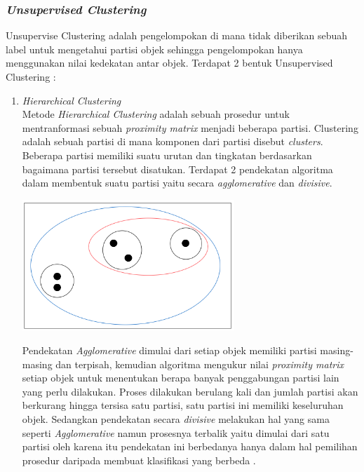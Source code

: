 \subsubsection{\textit{Unsupervised Clustering}}
Unsupervise Clustering adalah pengelompokan di mana tidak diberikan sebuah label untuk mengetahui partisi objek sehingga pengelompokan hanya menggunakan nilai kedekatan antar objek. Terdapat 2 bentuk Unsupervised Clustering \cite{2C9}:
\begin{enumerate}[leftmargin=1.3cm]
	\item \textit{Hierarchical Clustering} \\
	Metode \textit{Hierarchical Clustering} adalah sebuah prosedur untuk mentranformasi sebuah \textit{proximity matrix} menjadi beberapa partisi. Clustering adalah sebuah partisi di mana komponen dari partisi disebut \textit{clusters}. Beberapa partisi memiliki suatu urutan dan tingkatan berdasarkan bagaimana partisi tersebut disatukan. Terdapat 2 pendekatan algoritma dalam membentuk suatu partisi yaitu secara \textit{agglomerative} dan \textit{divisive}.\cite{2C9} 

	\begin{center}
		\includegraphics[width=8cm]{img/bab_2/hierarchi.png}
		\label{fig:asd}
	\end{center}

	Pendekatan \textit{Agglomerative} dimulai dari setiap objek memiliki partisi masing-masing dan terpisah, kemudian algoritma mengukur nilai \textit{proximity matrix} setiap objek untuk menentukan berapa banyak penggabungan partisi lain yang perlu dilakukan. Proses dilakukan berulang kali dan jumlah partisi akan berkurang hingga tersisa satu partisi, satu partisi ini memiliki keseluruhan objek. Sedangkan pendekatan secara \textit{divisive} melakukan hal yang sama seperti \textit{Agglomerative} namun prosesnya terbalik yaitu dimulai dari satu partisi oleh karena itu pendekatan ini berbedanya hanya dalam hal pemilihan prosedur daripada membuat klasifikasi yang berbeda \cite{2C9}.


\end{enumerate}

